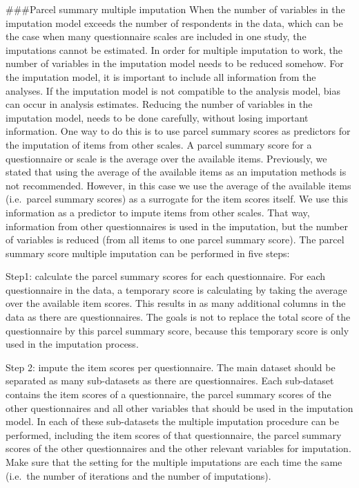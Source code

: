 \documentclass[
]{book}
\begin{document}
\#\#\#Parcel summary multiple imputation When the number of variables in
the imputation model exceeds the number of respondents in the data,
which can be the case when many questionnaire scales are included in one
study, the imputations cannot be estimated. In order for multiple
imputation to work, the number of variables in the imputation model
needs to be reduced somehow. For the imputation model, it is important
to include all information from the analyses. If the imputation model is
not compatible to the analysis model, bias can occur in analysis
estimates. Reducing the number of variables in the imputation model,
needs to be done carefully, without losing important information. One
way to do this is to use parcel summary scores as predictors for the
imputation of items from other scales. A parcel summary score for a
questionnaire or scale is the average over the available items.
Previously, we stated that using the average of the available items as
an imputation methods is not recommended. However, in this case we use
the average of the available items (i.e.~parcel summary scores) as a
surrogate for the item scores itself. We use this information as a
predictor to impute items from other scales. That way, information from
other questionnaires is used in the imputation, but the number of
variables is reduced (from all items to one parcel summary score). The
parcel summary score multiple imputation can be performed in five steps:

Step1: calculate the parcel summary scores for each questionnaire. For
each questionnaire in the data, a temporary score is calculating by
taking the average over the available item scores. This results in as
many additional columns in the data as there are questionnaires. The
goals is not to replace the total score of the questionnaire by this
parcel summary score, because this temporary score is only used in the
imputation process.

Step 2: impute the item scores per questionnaire. The main dataset
should be separated as many sub-datasets as there are questionnaires.
Each sub-dataset contains the item scores of a questionnaire, the parcel
summary scores of the other questionnaires and all other variables that
should be used in the imputation model. In each of these sub-datasets
the multiple imputation procedure can be performed, including the item
scores of that questionnaire, the parcel summary scores of the other
questionnaires and the other relevant variables for imputation. Make
sure that the setting for the multiple imputations are each time the
same (i.e.~the number of iterations and the number of imputations).
\end{document}
